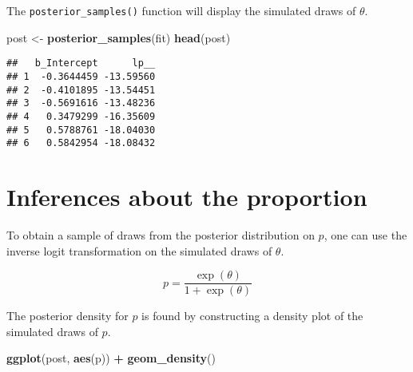 \documentclass[
]{book}
\newenvironment{Shaded}{\begin{snugshade}}{\end{snugshade}}
\newcommand{\DataTypeTok}[1]{\textcolor[rgb]{0.13,0.29,0.53}{#1}}
\newcommand{\DecValTok}[1]{\textcolor[rgb]{0.00,0.00,0.81}{#1}}
\newcommand{\KeywordTok}[1]{\textcolor[rgb]{0.13,0.29,0.53}{\textbf{#1}}}
\newcommand{\NormalTok}[1]{#1}
\newcommand{\OperatorTok}[1]{\textcolor[rgb]{0.81,0.36,0.00}{\textbf{#1}}}
\newcommand{\StringTok}[1]{\textcolor[rgb]{0.31,0.60,0.02}{#1}}
\begin{document}
The \texttt{posterior\_samples()} function will display the simulated draws of \(\theta\).

\begin{Shaded}
\begin{Highlighting}[]
\NormalTok{post <-}\StringTok{ }\KeywordTok{posterior_samples}\NormalTok{(fit)}
\KeywordTok{head}\NormalTok{(post)}
\end{Highlighting}
\end{Shaded}

\begin{verbatim}
##   b_Intercept      lp__
## 1  -0.3644459 -13.59560
## 2  -0.4101895 -13.54451
## 3  -0.5691616 -13.48236
## 4   0.3479299 -16.35609
## 5   0.5788761 -18.04030
## 6   0.5842954 -18.08432
\end{verbatim}

\hypertarget{inferences-about-the-proportion}{%
\section{Inferences about the proportion}\label{inferences-about-the-proportion}}

To obtain a sample of draws from the posterior distribution on \(p\), one can use the inverse logit transformation on the simulated draws of \(\theta\).

\[
p = \frac{\exp(\theta)}{1 + \exp(\theta)}
\]

\begin{Shaded}
\end{Shaded}

The posterior density for \(p\) is found by constructing a density plot of the simulated draws of \(p\).

\begin{Shaded}
\begin{Highlighting}[]
\KeywordTok{ggplot}\NormalTok{(post, }\KeywordTok{aes}\NormalTok{(p)) }\OperatorTok{+}
\StringTok{  }\KeywordTok{geom_density}\NormalTok{()}
\end{Highlighting}
\end{Shaded}
\end{document}
